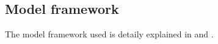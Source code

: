 \subsection{Model framework }
	The model framework used is detaily explained in \cite{Fernandez-de-Cossio-Diaz2017} and \cite{Fernandez-de-Cossio-Diaz2018b}.
		